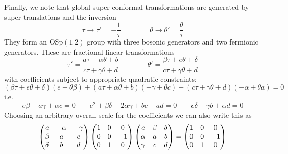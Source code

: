 \documentclass[aps,pre,preprint,onecolumn,citeautoscript,superscriptaddress,nofootinbib,eqsecnum]{revtex4-1}
\begin{document}
Finally, we note that
global super-conformal transformations are generated by super-translations and the inversion 
\begin{equation}
\tau \to \tau' =-\frac{1}{\tau}  \qquad \qquad \theta \to \theta' = \frac{\theta}{\tau} 
\end{equation}
They form an OSp$(1|2)$ group with three bosonic generators and two fermionic generators. 
These are fractional linear transformations 
\begin{equation}
\tau' = \frac{a \tau + \alpha \theta + b}{c \tau + \gamma \theta + d} \qquad \qquad \theta' = \frac{\beta \tau + e \theta + \delta}{c \tau + \gamma \theta + d} 
\end{equation}
with coefficients subject to appropriate quadratic constraints:
\begin{equation}
(\beta \tau + e \theta + \delta)(e + \theta \beta)+ (a \tau + \alpha \theta + b)(- \gamma + \theta c) - (c \tau + \gamma \theta + d)(- \alpha + \theta a) =0 
\end{equation}
i.e. 
\begin{equation}
e\beta - a  \gamma+ \alpha c =0 \qquad  e^2 +\beta \delta+2 \alpha \gamma+ b c-a d =0 \qquad e \delta -\gamma b + \alpha d =0 
\end{equation}
Choosing an arbitrary overall scale for the coefficients we can also write this as 
\begin{equation}
\begin{pmatrix}e & -\alpha & -\gamma \cr \beta & a & c \cr \delta & b & d \end{pmatrix}\begin{pmatrix}1 & 0 & 0 \cr 0&0&-1 \cr 0&1&0 \end{pmatrix}   \begin{pmatrix}e & \beta& \delta \cr \alpha & a & b \cr \gamma & c & d \end{pmatrix}= \begin{pmatrix}1 & 0 & 0 \cr 0&0&-1 \cr 0&1&0 \end{pmatrix}  
\end{equation}
\end{document}
